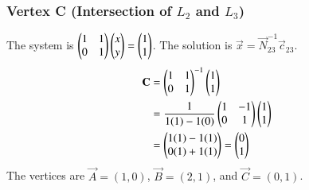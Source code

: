 \documentclass[journal]{IEEEtran}
\begin{document}
\subsubsection*{Vertex C (Intersection of $L_2$ and $L_3$)}
The system is $\begin{pmatrix}1 & 1 \\ 0 & 1\end{pmatrix} \begin{pmatrix}x \\ y\end{pmatrix} = \begin{pmatrix}1 \\ 1\end{pmatrix}$. The solution is $\vec{x} = \vec{N}_{23}^{-1}\vec{c}_{23}$.
\begin{align}  
\mathbf{C} &= \begin{pmatrix}1 & 1 \\ 0 & 1\end{pmatrix}^{-1} \begin{pmatrix}1 \\ 1\end{pmatrix} \\
&= \frac{1}{1(1) - 1(0)} \begin{pmatrix}1 & -1 \\ 0 & 1\end{pmatrix} \begin{pmatrix}1 \\ 1\end{pmatrix} \\
&= \begin{pmatrix}1(1) - 1(1) \\ 0(1) + 1(1)\end{pmatrix} = \begin{pmatrix}0 \\ 1\end{pmatrix}
\end{align}  
The vertices are $\vec{A}=(1,0)$, $\vec{B}=(2,1)$, and $\vec{C}=(0,1)$.
\end{document}
